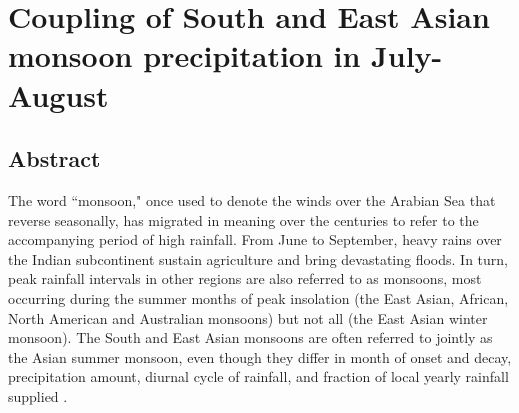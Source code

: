 \chapter{Coupling of South and East Asian monsoon precipitation in July-August}

\section{Abstract}

	The word ``monsoon," once used to denote the winds over the Arabian Sea that reverse seasonally, has migrated in meaning over the centuries to refer to the accompanying period of high rainfall. From June to September, heavy rains over the Indian subcontinent sustain agriculture \citep{Gadgil2006} and bring devastating floods. In turn, peak rainfall intervals in other regions are also referred to as monsoons, most occurring during the summer months of peak insolation (the East Asian, African, North American and Australian monsoons) but not all (the East Asian winter monsoon). The South and East Asian monsoons are often referred to jointly as the Asian summer monsoon, even though they differ in month of onset and decay, precipitation amount, diurnal cycle of rainfall, and fraction of local yearly rainfall supplied \citep{Zhou2008,Molnar2010,Biasutti2011}.

